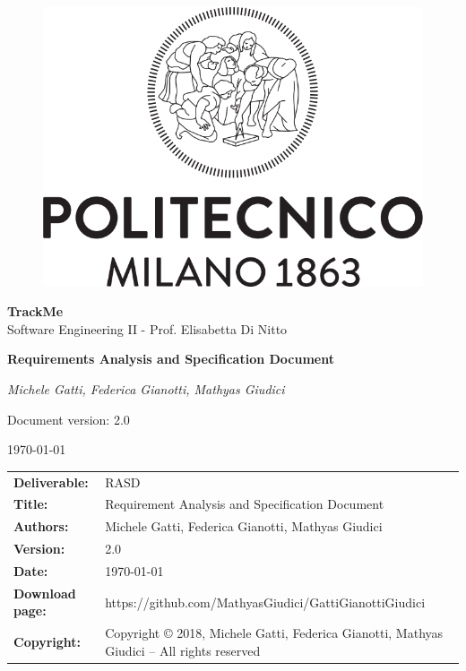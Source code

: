 \documentclass[a4paper,12pt]{report}
\begin{document}
\begin{titlepage}
\centering
	\begin{center}{
		\begin{figure}[h]
		\large
		\centering
		{\includegraphics[width=.60\linewidth]{img/logo_poli}}
        \end{figure}
    	}
	\end{center}
	\vspace{1 cm}
	{\Large {\textbf{\LARGE TrackMe} \\
		Software Engineering II - Prof. Elisabetta Di Nitto} \par}
	\vspace{1.5cm}
	{\LARGE \textbf{Requirements Analysis and Specification Document} \par}
	\vspace{1.5cm}
	{\Large\itshape Michele Gatti, Federica Gianotti, Mathyas Giudici\par}
	\vspace{2cm}
	\vfill
	{\large Document version: 2.0\par}
	{\large \today \par}
\end{titlepage}

{
\begin{table}[h!]
\begin{tabu} to \textwidth { X[0.3,r,p] X[0.7,l,p] }
\textbf{Deliverable:} & RASD\\
\textbf{Title:} & Requirement Analysis and Specification Document \\
\textbf{Authors:} & Michele Gatti, Federica Gianotti, Mathyas Giudici \\
\textbf{Version:} & 2.0 \\
\textbf{Date:} & \today \\
\textbf{Download page:} & https://github.com/MathyasGiudici/GattiGianottiGiudici \\
\textbf{Copyright:} & Copyright © 2018, Michele Gatti, Federica Gianotti, Mathyas Giudici – All rights reserved \\
\end{tabu}
\end{table}

\setcounter{page}{2}
}
\end{document}
